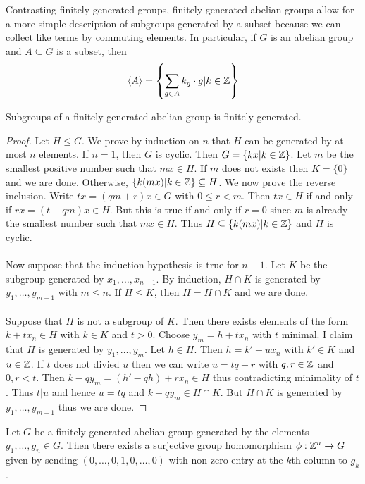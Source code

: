 \documentclass[a4paper]{article}
\begin{document}
Contrasting finitely generated groups, finitely generated abelian groups allow for a more simple description of subgroups generated by a subset because we can collect like terms by commuting elements. In particular, if $G$ is an abelian group and $A\subseteq G$ is a subset, then $$\langle A\rangle=\left\{\sum_{g\in A}k_g\cdot g|k\in\mathbb{Z}\right\}$$

\begin{prp}{}{} Subgroups of a finitely generated abelian group is finitely generated. \tcbline
\begin{proof}
Let $H\leq G$. We prove by induction on $n$ that $H$ can be generated by at most $n$ elements. If $n=1$, then $G$ is cyclic. Then $G=\{kx|k\in\mathbb{Z}\}$. Let $m$ be the smallest positive number such that $mx\in H$. If $m$ does not exists then $K=\{0\}$ and we are done. Otherwise, $\{k(mx)|k\in\mathbb{Z}\}\subseteq H$. We now prove the reverse inclusion. Write $tx=(qm+r)x\in G$ with $0\leq r<m$. Then $tx\in H$ if and only if $rx=(t-qm)x\in H$. But this is true if and only if $r=0$ since $m$ is already the smallest number such that $mx\in H$. Thus $H\subseteq\{k(mx)|k\in\mathbb{Z}\}$ and $H$ is cyclic. \\~\\
Now suppose that the induction hypothesis is true for $n-1$.  Let $K$ be the subgroup generated by $x_1,\dots,x_{n-1}$. By induction, $H\cap K$ is generated by $y_1,\dots,y_{m-1}$ with $m\leq n$. If $H\leq K$, then $H=H\cap K$ and we are done. \\~\\
Suppose that $H$ is not a subgroup of $K$. Then there exists elements of the form $k+tx_n\in H$ with $k\in K$ and $t>0$. Choose $y_m=h+tx_n$ with $t$ minimal. I claim that $H$ is generated by $y_1,\dots,y_m$. Let $h\in H$. Then $h=k'+ux_n$ with $k'\in K$ and $u\in\mathbb{Z}$. If $t$ does not divied $u$ then we can write $u=tq+r$ with $q,r\in\mathbb{Z}$ and $0,r<t$. Then $k-qy_m=(h'-qh)+rx_n\in H$ thus contradicting minimality of $t$. Thus $t|u$ and hence $u=tq$ and $k-qy_m\in H\cap K$. But $H\cap K$ is generated by $y_1,\dots,y_{m-1}$ thus we are done. 
\end{proof}
\end{prp}

\begin{prp}{}{} Let $G$ be a finitely generated abelian group generated by the elements $g_1,\dots,g_n\in G$. Then there exists a surjective group homomorphism $\phi:\mathbb{Z}^n\to G$ given by sending $(0,\dots,0,1,0,\dots,0)$ with non-zero entry at the $k$th column to $g_k$. 
\end{prp}
\end{document}
